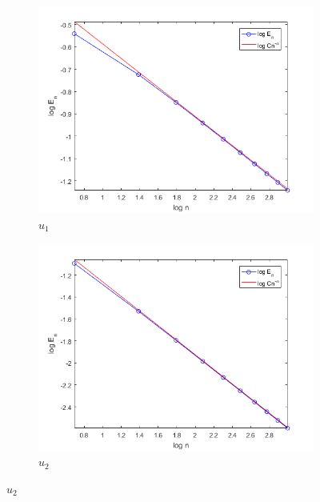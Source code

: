 \documentclass[12pt]{article}
\begin{document}
\subsection{} %

\begin{figure}
    \begin{subfigure}[t]{.49\textwidth}
        \centering
        \includegraphics[width=\linewidth]{u1_err_alpha}
        \caption{$u_1$}
    \end{subfigure}\hfill
    \begin{subfigure}[t]{.49\textwidth}
        \centering
        \includegraphics[width=\linewidth]{u2_err_alpha}
        \caption{$u_2$}
    \end{subfigure}
    \label{u2_err_alpha}
\end{figure}
\end{document}
